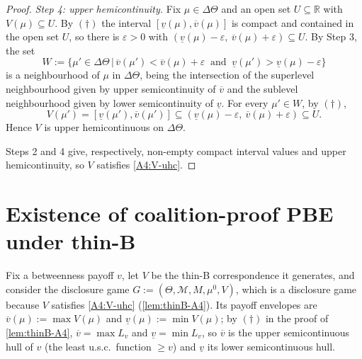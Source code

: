\documentclass[11pt]{article}
\newcommand{\sep}{\,|\,}
\newcommand{\Msg}{\mathcal{M}}
\begin{document}
\begin{proof}
    \emph{Step 4: upper hemicontinuity.} Fix $\mu\in\Delta\Theta$ and an open set
    $U\subseteq\mathbb{R}$ with $V(\mu)\subseteq U$. By $(\dagger)$ the interval
    $[\underline v(\mu),\overline v(\mu)]$ is compact and contained in the open set
    $U$, so there is $\varepsilon>0$ with
    $(\underline v(\mu)-\varepsilon,\ \overline v(\mu)+\varepsilon)\subseteq U$. By
    Step 3, the set
    \[
        W:=\bigl\{\mu'\in\Delta\Theta\sep
            \overline v(\mu')<\overline v(\mu)+\varepsilon
            \ \text{ and }\
            \underline v(\mu')>\underline v(\mu)-\varepsilon\bigr\}
    \]
    is a neighbourhood of $\mu$ in $\Delta\Theta$, being the intersection of the
    superlevel neighbourhood given by upper semicontinuity of $\overline v$ and
    the sublevel neighbourhood given by lower semicontinuity of $\underline v$.
    For every $\mu'\in W$, by $(\dagger)$,
    \[
        V(\mu')=[\underline v(\mu'),\overline v(\mu')]
        \subseteq(\underline v(\mu)-\varepsilon,\ \overline v(\mu)+\varepsilon)
        \subseteq U.
    \]
    Hence $V$ is upper hemicontinuous on $\Delta\Theta$.

    Steps 2 and 4 give, respectively, non-empty compact interval values and
    upper hemicontinuity, so $V$ satisfies \cref{A4:V-uhc}.
\end{proof}

\section*{Existence of coalition-proof PBE under thin-B}

Fix a betweenness payoff $v$, let $V$ be the thin-B correspondence it generates,
and consider the disclosure game $G:=(\Theta,\Msg,M,\mu^0,V)$, which is a
disclosure game because $V$ satisfies \cref{A4:V-uhc} (\cref{lem:thinB-A4}). Its
payoff envelopes are $\overline v(\mu):=\max V(\mu)$ and
$\underline v(\mu):=\min V(\mu)$; by $(\dagger)$ in the proof of
\cref{lem:thinB-A4}, $\overline v=\max L_v$ and $\underline v=\min L_v$, so
$\overline v$ is the upper semicontinuous hull of $v$ (the least u.s.c.\ function
$\ge v$) and $\underline v$ its lower semicontinuous hull.
\end{document}
